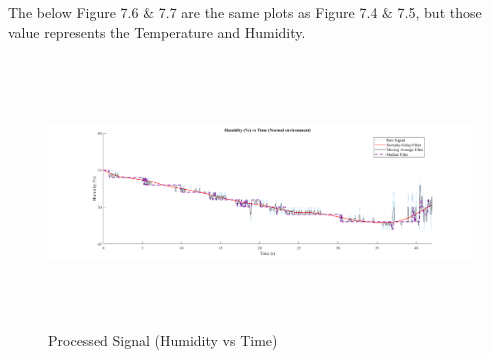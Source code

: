 \begin{enumerate}[label=\roman*]

\par

\par


\vspace{\baselineskip}
\begin{justify}
The below Figure 7.6 $\&$  7.7 are the same plots as Figure 7.4 $\&$  7.5, but those value represents the Temperature and Humidity.
\end{justify}\par




\begin{figure}[H]
	\begin{Center}
		\includegraphics[width=6.36in,height=2.81in]{20}
		\caption{Processed Signal (Humidity vs Time)}
		\label{fig:_6_Processed_Signal_Humidity_vs_Time}
	\end{Center}
\end{figure}



\par

\par


\vspace{\baselineskip}




\end{enumerate}
